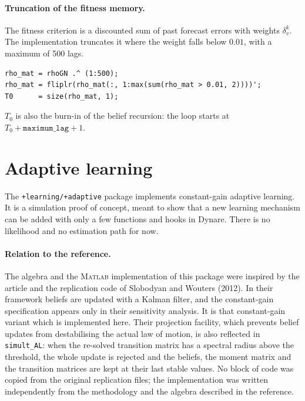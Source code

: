 \documentclass[11pt,a4paper]{article}
\newcommand{\file}[1]{\texttt{#1}}
\newcommand{\matlab}{\textsc{Matlab}}
\begin{document}
\paragraph{Truncation of the fitness memory.}
The fitness criterion is a discounted sum of past forecast errors with weights
$\delta_v^k$. The implementation truncates it where the weight falls below
$0.01$, with a maximum of 500 lags.

\begin{lstlisting}[style=matlab]
rho_mat = rhoGN .^ (1:500);
rho_mat = fliplr(rho_mat(:, 1:max(sum(rho_mat > 0.01, 2))))';
T0      = size(rho_mat, 1);
\end{lstlisting}

$T_0$ is also the burn-in of the belief recursion: the loop starts at
$T_0 + \texttt{maximum\_lag} + 1$.


\section{Adaptive learning}
\label{sec:adaptive}

The \file{+learning/+adaptive} package implements constant-gain adaptive
learning. It is a simulation proof of concept, meant to show that a new
learning mechanism can be added with only a few functions and hooks in Dynare.
There is no likelihood and no estimation path for now.

\paragraph{Relation to the reference.}
The algebra and the \matlab{} implementation of this package were inspired by
the article and the replication code of Slobodyan and Wouters (2012). In their
framework beliefs are updated with a Kalman filter, and the constant-gain
specification appears only in their sensitivity analysis. It is that
constant-gain variant which is implemented here. Their projection facility,
which prevents belief updates from destabilising the actual law of motion, is
also reflected in \texttt{simult\_AL}: when the re-solved transition matrix has
a spectral radius above the threshold, the whole update is rejected and the
beliefs, the moment matrix and the transition matrices are kept at their last
stable values. No block of code was copied from the original replication files;
the implementation was written independently from the methodology and the
algebra described in the reference.
\end{document}
